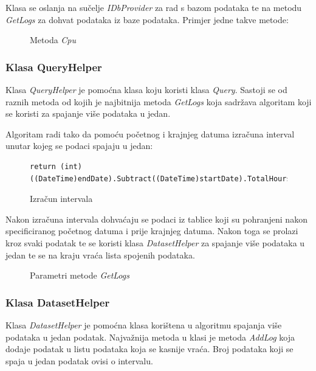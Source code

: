 \documentclass[zavrsnirad]{fer}
\begin{document}
Klasa se oslanja na sučelje \textit{IDbProvider} za rad s bazom podataka te na metodu \textit{GetLogs} za dohvat podataka iz baze podataka. Primjer jedne takve metode:
\begin{figure}[htb]
	\centering
	
	\caption{Metoda \textit{Cpu}}
\end{figure}
\FloatBarrier

\subsubsection{Klasa QueryHelper}
Klasa \textit{QueryHelper} je pomoćna klasa koju koristi klasa \textit{Query}. Sastoji se od raznih metoda od kojih je najbitnija metoda \textit{GetLogs} koja sadržava algoritam koji se koristi za spajanje više podataka u jedan.

Algoritam radi tako da pomoću početnog i krajnjeg datuma izračuna interval unutar kojeg se podaci spajaju u jedan:
\begin{figure}[htb]
	\centering
	\begin{lstlisting}[language=CSharp]
		return (int)((DateTime)endDate).Subtract((DateTime)startDate).TotalHours;
	\end{lstlisting}
	\caption{Izračun intervala}
\end{figure}
\FloatBarrier

Nakon izračuna intervala dohvaćaju se podaci iz tablice koji su pohranjeni nakon specificiranog početnog datuma i prije krajnjeg datuma. Nakon toga se prolazi kroz svaki podatak te se koristi klasa \textit{DatasetHelper} za spajanje više podataka u jedan te se na kraju vraća lista spojenih podataka.
\begin{figure}[htb]
	\centering
	
	\caption{Parametri metode \textit{GetLogs}}
	\label{GetLogs}
\end{figure}
\FloatBarrier

\subsubsection{Klasa DatasetHelper}
\label{pog:dataset_helper}
Klasa \textit{DatasetHelper} je pomoćna klasa korištena u algoritmu spajanja više podataka u jedan podatak. Najvažnija metoda u klasi je metoda \textit{AddLog} koja dodaje podatak u listu podataka koja se kasnije vraća. Broj podataka koji se spaja u jedan podatak ovisi o intervalu.
\end{document}
